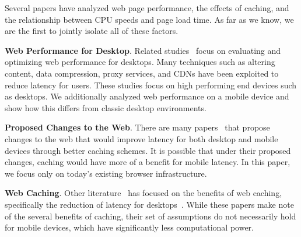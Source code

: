 
Several papers have analyzed web page performance, the effects of caching, and the relationship between CPU speeds and page load time.
As far as we know, we are the first to jointly isolate all of these factors. %

\textbf{Web Performance for Desktop}. Related studies~\cite{web-perf-2, web-perf-3} focus on evaluating and optimizing web performance for desktops. Many techniques such as altering content, data compression, proxy services, and CDNs have been exploited to reduce latency for users. These studies focus on high performing end devices such as desktops. We additionally analyzed web performance on a mobile device and show how this differs from classic desktop environments.

\textbf{Proposed Changes to the Web}. There are many papers~\cite{web-perf-4-new-design, web-caching-4-new-design, web-caching-5-new-design, web-caching-latency-1-new-design, web-caching-latency-2-new-design, web-caching-latency-3-new-design, web-caching-latency-5-new-design, web-caching-latency-6-new-design, web-caching-latency-7-new-design} that propose changes to the web that would improve latency for both desktop and mobile devices through better caching schemes. It is possible that under their proposed changes, caching would have more of a benefit for mobile latency. In this paper, we focus only on today's existing browser infrastructure. %

\textbf{Web Caching}. Other literature~\cite{web-caching-1, web-caching-2, web-caching-8, web-caching-9} has focused on the benefits of web caching, specifically the reduction of latency for desktops~\cite{web-caching-3, web-caching-4, web-caching-5, web-caching-6, web-caching-7}.
While these papers make note of the several benefits of caching, their set of assumptions do not necessarily hold for mobile devices, which have significantly less computational power. 

